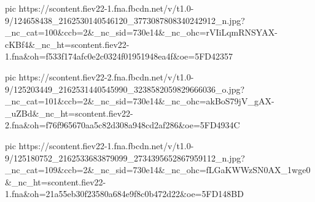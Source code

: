 pic https://scontent.fiev22-1.fna.fbcdn.net/v/t1.0-9/124658438_2162530140546120_3773087808340242912_n.jpg?_nc_cat=100&ccb=2&_nc_sid=730e14&_nc_ohc=rVIiLqmRNSYAX-cKBf4&_nc_ht=scontent.fiev22-1.fna&oh=f533f174afc0e2c0324f01951948ea4f&oe=5FD42357

pic https://scontent.fiev22-2.fna.fbcdn.net/v/t1.0-9/125203449_2162531440545990_3238582059829666036_o.jpg?_nc_cat=101&ccb=2&_nc_sid=730e14&_nc_ohc=akBoS79jV_gAX-_uZBd&_nc_ht=scontent.fiev22-2.fna&oh=f76f965670aa5c82d308a948cd2af286&oe=5FD4934C

pic https://scontent.fiev22-1.fna.fbcdn.net/v/t1.0-9/125180752_2162533683879099_2734395652867959112_n.jpg?_nc_cat=109&ccb=2&_nc_sid=730e14&_nc_ohc=fLGaKWWzSN0AX_1wge0&_nc_ht=scontent.fiev22-1.fna&oh=21a55eb30f23580a684e9f8c0b472d22&oe=5FD148BD
\fi
